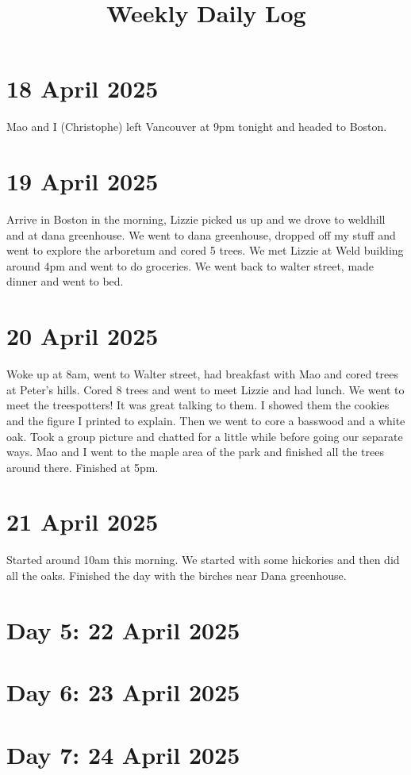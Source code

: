 \documentclass{article}
\begin{document}
\title{Weekly Daily Log}
\date{}
\maketitle

\section*{18 April 2025}
Mao and I (Christophe) left Vancouver at 9pm tonight and headed to Boston. 

\section*{19 April 2025}
Arrive in Boston in the morning, Lizzie picked us up and we drove to weldhill and at dana greenhouse. We went to dana greenhouse, dropped off my stuff and went to explore the arboretum and cored 5 trees. We met Lizzie at Weld building around 4pm and went to do groceries. We went back to walter street, made dinner and went to bed.

\section*{ 20 April 2025}
Woke up at 8am, went to Walter street, had breakfast with Mao and cored trees at Peter's hills. Cored 8 trees and went to meet Lizzie and had lunch. We went to meet the treespotters! It was great talking to them. I showed them the cookies and the figure I printed to explain. Then we went to core a basswood and a white oak. Took a group picture and chatted for a little while before going our separate ways. Mao and I went to the maple area of the park and finished all the trees around there. Finished at 5pm.

\section*{21 April 2025}
Started around 10am this morning. We started with some hickories and then did all the oaks. Finished the day with the birches near Dana greenhouse. 
\section*{Day 5: 22 April 2025}

\section*{Day 6: 23 April 2025}


\section*{Day 7: 24 April 2025}
\end{document}
